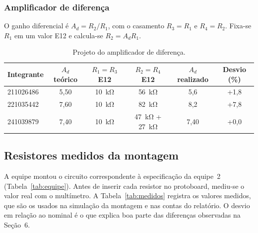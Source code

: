\documentclass[11pt,a4paper]{article}
\begin{document}
\subsubsection{Amplificador de diferença}

O ganho diferencial é $A_d = R_2/R_1$, com o casamento $R_3 = R_1$ e $R_4 = R_2$. Fixa-se $R_1$ em um valor E12 e calcula-se $R_2 = A_d R_1$.

\begin{table}[h]
\centering
\caption{Projeto do amplificador de diferença.}
\label{tab:projeto_dif}
\begin{tabular}{lccccc}
\hline
Integrante & $A_d$ teórico & $R_1 = R_3$ E12 & $R_2 = R_4$ E12 & $A_d$ realizado & Desvio (\%) \\
\hline
211026486 & 5,50 & \SI{10}{\kilo\ohm} & \SI{56}{\kilo\ohm} & 5,6 & +1,8 \\
221035442 & 7,60 & \SI{10}{\kilo\ohm} & \SI{82}{\kilo\ohm} & 8,2 & +7,8 \\
241039879 & 7,40 & \SI{10}{\kilo\ohm} & \SI{47}{\kilo\ohm} + \SI{27}{\kilo\ohm} & 7,40 & +0,0 \\
\hline
\end{tabular}
\end{table}

\subsection{Resistores medidos da montagem}

A equipe montou o circuito correspondente à especificação da equipe~2 (Tabela~\ref{tab:equipe}). Antes de inserir cada resistor no protoboard, mediu-se o valor real com o multímetro. A Tabela~\ref{tab:medidos} registra os valores medidos, que são os usados na simulação da montagem e nas contas do relatório. O desvio em relação ao nominal é o que explica boa parte das diferenças observadas na Seção~6.
\end{document}
